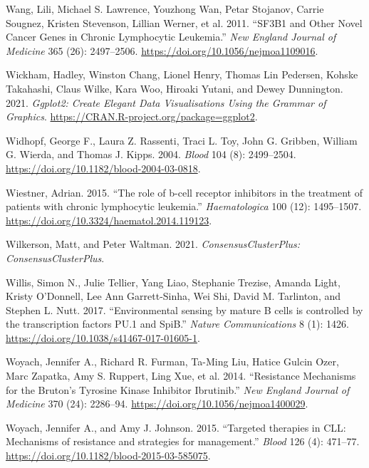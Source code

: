 \documentclass[11pt, a4paper, twosided]{book}
\newenvironment{CSLReferences}%
  {}%
  {\par}
\begin{document}
\begin{CSLReferences}{1}{0}
\leavevmode{}%
Wang, Lili, Michael S. Lawrence, Youzhong Wan, Petar Stojanov, Carrie Sougnez, Kristen Stevenson, Lillian Werner, et al. 2011. {``{SF3B1 and Other Novel Cancer Genes in Chronic Lymphocytic Leukemia}.''} \emph{New England Journal of Medicine} 365 (26): 2497--2506. \url{https://doi.org/10.1056/nejmoa1109016}.

\leavevmode{}%
Wickham, Hadley, Winston Chang, Lionel Henry, Thomas Lin Pedersen, Kohske Takahashi, Claus Wilke, Kara Woo, Hiroaki Yutani, and Dewey Dunnington. 2021. \emph{Ggplot2: Create Elegant Data Visualisations Using the Grammar of Graphics}. \url{https://CRAN.R-project.org/package=ggplot2}.

\leavevmode{}%
Widhopf, George F., Laura Z. Rassenti, Traci L. Toy, John G. Gribben, William G. Wierda, and Thomas J. Kipps. 2004. \emph{Blood} 104 (8): 2499--2504. \url{https://doi.org/10.1182/blood-2004-03-0818}.

\leavevmode{}%
Wiestner, Adrian. 2015. {``{The role of b-cell receptor inhibitors in the treatment of patients with chronic lymphocytic leukemia}.''} \emph{Haematologica} 100 (12): 1495--1507. \url{https://doi.org/10.3324/haematol.2014.119123}.

\leavevmode{}%
Wilkerson, Matt, and Peter Waltman. 2021. \emph{ConsensusClusterPlus: ConsensusClusterPlus}.

\leavevmode{}%
Willis, Simon N., Julie Tellier, Yang Liao, Stephanie Trezise, Amanda Light, Kristy O'Donnell, Lee Ann Garrett-Sinha, Wei Shi, David M. Tarlinton, and Stephen L. Nutt. 2017. {``{Environmental sensing by mature B cells is controlled by the transcription factors PU.1 and SpiB}.''} \emph{Nature Communications} 8 (1): 1426. \url{https://doi.org/10.1038/s41467-017-01605-1}.

\leavevmode{}%
Woyach, Jennifer A., Richard R. Furman, Ta-Ming Liu, Hatice Gulcin Ozer, Marc Zapatka, Amy S. Ruppert, Ling Xue, et al. 2014. {``{Resistance Mechanisms for the Bruton's Tyrosine Kinase Inhibitor Ibrutinib}.''} \emph{New England Journal of Medicine} 370 (24): 2286--94. \url{https://doi.org/10.1056/nejmoa1400029}.

\leavevmode{}%
Woyach, Jennifer A., and Amy J. Johnson. 2015. {``{Targeted therapies in CLL: Mechanisms of resistance and strategies for management}.''} \emph{Blood} 126 (4): 471--77. \url{https://doi.org/10.1182/blood-2015-03-585075}.


\end{CSLReferences}
\end{document}
